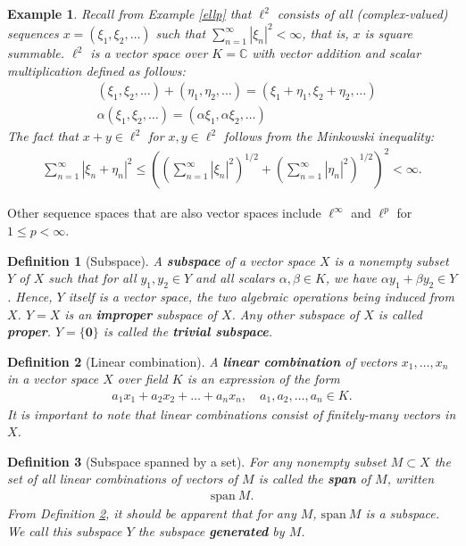 \documentclass[11pt]{article}
\theoremstyle{mystyle}
\newtheorem{defn}{Definition}[section]
\newtheorem{protoexamp}{Example}[section]
\newenvironment{examp}
{\colorlet{shadecolor}{orange!15}\begin{shaded}\begin{protoexamp}}
{\end{protoexamp}\end{shaded}}
\newcommand{\0}{\mathbf{0}}
\begin{document}
\begin{examp}
Recall from Example \ref{ellp} that $\ell^2$ consists of all (complex-valued) sequences $x = (\xi_1, \xi_2, \ldots)$ such that $\sum_{n=1}^{\infty} |\xi_n|^2 < \infty$, that is, $x$ is square summable. $\ell^2$ is a vector space over $K = \mathbb{C}$ with vector addition and scalar multiplication defined as follows:
\begin{align*}
    &(\xi_1, \xi_2, \ldots) + (\eta_1, \eta_2, \ldots) = (\xi_1 + \eta_1, \xi_2 + \eta_2, \ldots)\\
    &\alpha(\xi_1, \xi_2, \ldots) = (\alpha \xi_1, \alpha \xi_2, \ldots)
\end{align*}
The fact that $x + y \in \ell^2$ for $x, y \in \ell^2$ follows from the Minkowski inequality:
\begin{align*}
   \sum_{n=1}^{\infty} |\xi_n + \eta_n|^2 \leq \left( \left(\sum_{n=1}^{\infty} |\xi_n|^2 \right)^{1/2} + \left(\sum_{n=1}^{\infty} |\eta_n|^2 \right)^{1/2} \right)^2 < \infty.
\end{align*}
\end{examp}
Other sequence spaces that are also vector spaces include $\ell^{\infty}$ and $\ell^{p}$ for $1 \leq p < \infty$.

\begin{defn}[Subspace]\label{subspace}
A \textbf{subspace} of a vector space $X$ is a nonempty subset $Y$ of $X$ such that for all $y_1, y_2 \in Y$ and all scalars $\alpha, \beta \in K$, we have $\alpha y_1 + \beta y_2 \in Y$. Hence, $Y$ itself is a vector space, the two algebraic operations being induced from $X$.\newline
$Y = X$ is an \textbf{improper} subspace of $X$. Any other subspace of $X$ is called \textbf{proper}. $Y = \{\0\}$ is called the \textbf{trivial subspace}.
\end{defn}

\begin{defn}[Linear combination]\label{lincomb}
A \textbf{linear combination} of vectors $x_1, \ldots, x_n$ in a vector space $X$ over field $K$ is an expression of the form
\begin{align*}
    a_1 x_1 + a_2 x_2 + \ldots + a_n x_n, \quad a_1, a_2, \ldots, a_n \in K.
\end{align*}
It is important to note that linear combinations consist of \textit{finitely-many} vectors in $X$.
\end{defn}

\begin{defn}[Subspace spanned by a set]
For any nonempty subset $M \subset X$ the set of all linear combinations of vectors of $M$ is called the \textbf{span} of $M$, written
\begin{align*}
    \text{span} \ M.
\end{align*}
From Definition \ref{lincomb}, it should be apparent that for any $M$, $\text{span} \ M$ is a subspace. We call this subspace $Y$ the subspace \textbf{generated} by $M$.
\end{defn}
\end{document}

